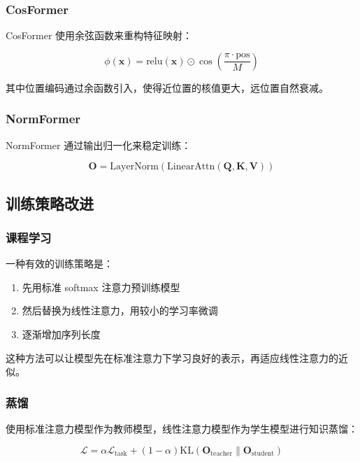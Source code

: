 \subsubsection{CosFormer}

CosFormer 使用余弦函数来重构特征映射：

\begin{equation}
    \phi(\mathbf{x}) = \text{relu}(\mathbf{x}) \odot \cos\left(\frac{\pi \cdot \text{pos}}{M}\right)
\end{equation}

其中位置编码通过余函数引入，使得近位置的核值更大，远位置自然衰减。

\subsubsection{NormFormer}

NormFormer 通过输出归一化来稳定训练：

\begin{equation}
    \mathbf{O} = \text{LayerNorm}\left(\text{LinearAttn}(\mathbf{Q}, \mathbf{K}, \mathbf{V})\right)
\end{equation}

\subsection{训练策略改进}

\subsubsection{课程学习}

一种有效的训练策略是：

\begin{enumerate}
    \item 先用标准 softmax 注意力预训练模型
    \item 然后替换为线性注意力，用较小的学习率微调
    \item 逐渐增加序列长度
\end{enumerate}

这种方法可以让模型先在标准注意力下学习良好的表示，再适应线性注意力的近似。

\subsubsection{蒸馏}

使用标准注意力模型作为教师模型，线性注意力模型作为学生模型进行知识蒸馏：

\begin{equation}
    \mathcal{L} = \alpha \mathcal{L}_{\text{task}} + (1-\alpha) \text{KL}(\mathbf{O}_{\text{teacher}} \| \mathbf{O}_{\text{student}})
\end{equation}

